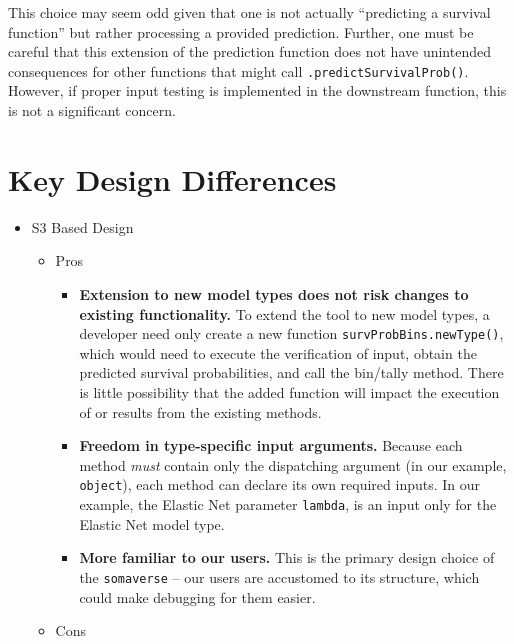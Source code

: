 \documentclass[
]{book}
\providecommand{\tightlist}{%
  \setlength{\itemsep}{0pt}\setlength{\parskip}{0pt}}
\begin{document}
This choice may seem odd given that one is not actually ``predicting a survival function'' but rather processing a provided prediction. Further, one must be careful that this extension of the prediction function does not have unintended consequences for other functions that might call \texttt{.predictSurvivalProb()}. However, if proper input testing is implemented in the downstream function, this is not a significant concern.

\hypertarget{key-design-differences}{%
\section{Key Design Differences}\label{key-design-differences}}

\begin{itemize}
\tightlist
\item
  S3 Based Design

  \begin{itemize}
  \tightlist
  \item
    Pros

    \begin{itemize}
    \tightlist
    \item
      \textbf{Extension to new model types does not risk changes to existing functionality.}
      To extend the tool to new model types, a developer need only create a new function \texttt{survProbBins.newType()}, which would need to execute the verification of input, obtain the predicted survival probabilities, and call the bin/tally method. There is little possibility that the added function will impact the execution of or results from the existing methods.
    \item
      \textbf{Freedom in type-specific input arguments.}
      Because each method \emph{must} contain only the dispatching argument (in our example, \texttt{object}), each method can declare its own required inputs. In our example, the Elastic Net parameter \texttt{lambda}, is an input only for the Elastic Net model type.
    \item
      \textbf{More familiar to our users.}
      This is the primary design choice of the \texttt{somaverse} -- our users are accustomed to its structure, which could make debugging for them easier.
    \end{itemize}
  \item
    Cons


\end{itemize}
\end{itemize}
\end{document}
